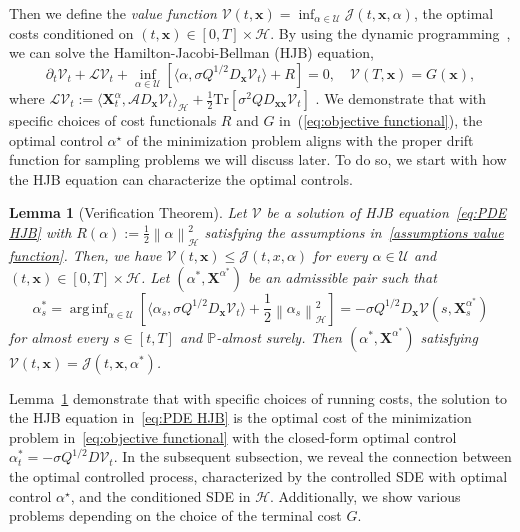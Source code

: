 \documentclass[nohyperref]{article}
\theoremstyle{plain}
\newtheorem{lemma}[theorem]{Lemma}
\theoremstyle{remark}
\newcommand{\la}{\langle}
\newcommand{\ra}{\rangle}
\newcommand{\mc}{\mathcal}
\newcommand{\mb}{\mathbf}
\newcommand{\norm}[1]{\left\lVert#1\right\rVert}
\DeclareMathOperator*{\arginf}{arg\,inf}
\begin{document}
Then we define the \textit{value function} $\mc{V}(t, \mb{x}) = \inf_{\alpha \in \mc{U}} \mc{J}(t, \mb{x}, \alpha)$, the optimal costs conditioned on $(t, \mb{x}) \in [0, T] \times \mc{H}$. 
By using the dynamic programming~\citep{fabbri2017stochastic}, we can solve the Hamilton-Jacobi-Bellman (HJB) equation,
\begin{equation}\label{eq:PDE HJB}
    \partial_t \mc{V}_t + \mc{L} \mc{V}_t + \inf_{\alpha \in \mc{U}} \left[\la \alpha, \sigma Q^{1/2} D_{\mb{x}} \mc{V}_t \ra + R \right] = 0, \quad \mc{V}(T, \mb{x}) = G(\mb{x}),
\end{equation}
where $\mc{L} \mc{V}_t := \la \mb{X}^{\alpha}_t, \mc{A} D_{\mb{x}} \mc{V}_t \ra_{\mc{H}} 
+ \frac{1}{2}\text{Tr}\left[\sigma^2 Q D_{\mb{xx}}\mc{V}_t \right]$ .
We demonstrate that with specific choices of cost functionals $R$ and $G$ in~(\ref{eq:objective functional}), the optimal control $\alpha^{\star}$ of the minimization problem aligns with the proper drift function for sampling problems we will discuss later. To do so, we start with how the HJB equation can characterize the optimal controls.
\begin{lemma}[Verification Theorem]\label{lemma:verification} Let $\mc{V}$ be a solution of HJB equation~\eqref{eq:PDE HJB} with $R(\alpha) := \frac{1}{2}\norm{\alpha}^2_{\mc{H}}$ satisfying the assumptions in~\ref{assumptions value function}. Then, we have $\mc{V}(t, \mb{x}) \leq \mathcal{J}(t, x, \alpha)$ for every $\alpha \in \mathcal{U}$ and $(t, \mb{x}) \in [0, T] \times \mc{H}$. Let $(\alpha^{*}, \mb{X}^{\alpha^{*}})$ be an admissible pair such that
\begin{equation}
\alpha_s^{*} = \arginf_{\alpha \in \mc{U}} \left[\la   \alpha_s, \sigma Q^{1/2} D_{\mb{x}} \mc{V}_t \ra + \frac{1}{2}\norm{\alpha_s}_{\mc{H}}^2 \right] = -\sigma Q^{1/2}D_{\mb{x}}\mc{V}(s, \mb{X}^{\alpha^{*}}_s)
\end{equation}
for almost every $s \in [t,  T]$ and $\mathbb{P}$-almost surely. Then $(\alpha^{*}, \mb{X}^{\alpha^{*}})$ satisfying $\mc{V}(t, \mb{x}) = \mathcal{J}(t, \mb{x}, \alpha^{*})$.
\end{lemma}
Lemma~\ref{lemma:verification} demonstrate that with specific choices of running costs, the solution to the HJB equation in~\eqref{eq:PDE HJB} is the optimal cost of the minimization problem in~\eqref{eq:objective functional} with the closed-form optimal control $\alpha_t^{*} = -\sigma Q^{1/2}D \mc{V}_t$. 
In the subsequent subsection, we reveal the connection between the optimal controlled process, characterized by the controlled SDE with optimal control $\alpha^{\star}$, and the conditioned SDE in $\mc{H}$. 
Additionally, we show various problems depending on the choice of the terminal cost $G$.
\end{document}

